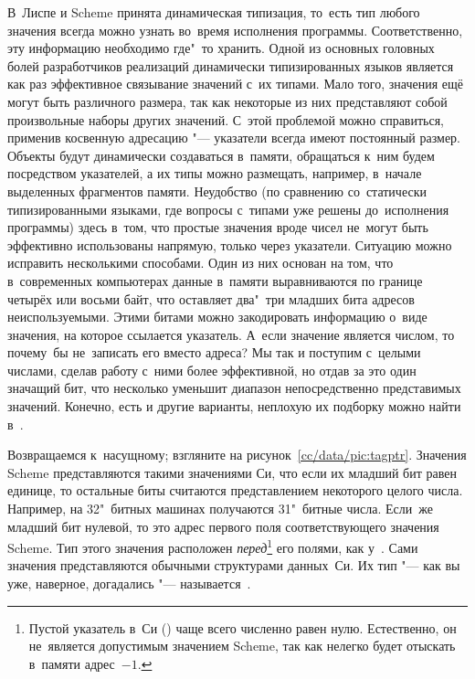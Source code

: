 В~Лиспе и Scheme принята динамическая типизация, то~есть тип любого значения
всегда можно узнать во~время исполнения программы. Соответственно, эту
информацию необходимо где"~то хранить. Одной из основных головных болей
разработчиков реализаций динамически типизированных языков является как раз
эффективное связывание значений с~их типами. Мало того, значения ещё могут быть
различного размера, так как некоторые из них представляют собой произвольные
наборы других значений. С~этой проблемой можно справиться, применив косвенную
адресацию "--- указатели всегда имеют постоянный размер. Объекты будут
динамически создаваться в~памяти, обращаться к~ним будем посредством указателей,
а их типы можно размещать, например, в~начале выделенных фрагментов памяти.
Неудобство (по сравнению со~статически типизированными языками, где вопросы
с~типами уже решены до~исполнения программы) здесь в~том, что простые значения
вроде чисел не~могут быть эффективно использованы напрямую, только через
указатели. Ситуацию можно исправить несколькими способами. Один из них основан
на том, что в~современных компьютерах данные в~памяти выравниваются по границе
четырёх или восьми байт, что оставляет два"~три младших бита адресов
неиспользуемыми. Этими битами можно закодировать информацию о~виде значения, на
которое ссылается указатель. А~если значение является числом, то почему~бы
не~записать его вместо адреса? Мы так и поступим с~целыми числами, сделав работу
с~ними более эффективной, но отдав за это один значащий бит, что несколько
уменьшит диапазон непосредственно представимых значений. Конечно, есть и другие
варианты, неплохую их подборку можно найти в~\cite{gud93}.

Возвращаемся к~насущному; взгляните на рисунок~\ref{cc/data/pic:tagptr}.
Значения Scheme представляются такими значениями Си, что если их младший бит
равен единице, то остальные биты считаются представлением некоторого целого
числа. Например, на 32"~битных машинах получаются 31"~битные числа. Если~же
младший бит нулевой, то это адрес первого поля соответствующего значения Scheme.
Тип этого значения расположен \emph{перед}\footnote{Пустой указатель в~Си
() чаще всего численно равен нулю. Естественно, он не~является
допустимым значением Scheme, так как нелегко будет отыскать в~памяти
адрес~$-1$.} его полями, как у~\cite{dps94a}. Сами значения представляются
обычными структурами данных~Си. Их тип "--- как вы уже, наверное, догадались
"--- называется~.

